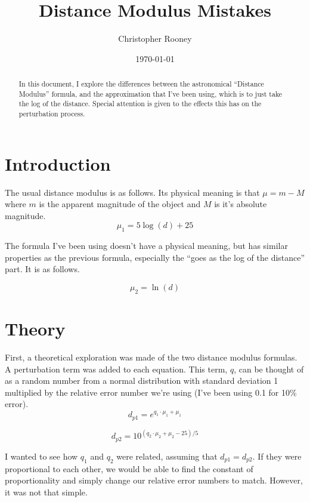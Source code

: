 \documentclass[usenatbib]{mn2e}
\begin{document}
\author{Christopher Rooney}
\date{\today}
\title{Distance Modulus Mistakes}
\maketitle

\begin{abstract}
In this document, I explore the differences between the astronomical ``Distance Modulus'' formula, and the approximation that I've been using, which is to just take the log of the distance. Special attention is given to the effects this has on the perturbation process.
\end{abstract}

\section{Introduction}
The usual distance modulus is as follows. Its physical meaning is that $\mu = m-M$ where $m$ is the apparent magnitude of the object and $M$ is it's absolute magnitude.
\begin{equation} \label{eq:modulus}
\mu_1 = 5\log\left(d\right) + 25
\end{equation}

The formula I've been using doesn't have a physical meaning, but has similar properties as the previous formula, especially the ``goes as the log of the distance'' part. It is as follows.

\begin{equation}\label{eq:log}
\mu_2 = \ln\left(d\right)
\end{equation}


\section{Theory}
First, a theoretical exploration was made of the two distance modulus formulas. A perturbation term was added to each equation. This term, $q$, can be thought of as a random number from a normal distribution with standard deviation 1 multiplied by the relative error number we're using (I've been using 0.1 for 10\% error).
\[
d_{p1} = e^{q_1\cdot\mu_1 + \mu_1}
\]

\[
d_{p2} = 10^{\left(q_2\cdot\mu_2 + \mu_2 - 25\right) / 5}
\]

I wanted to see how $q_1$ and $q_2$ were related, assuming that $d_{p1}=d_{p2}$. If they were proportional to each other, we would be able to find the constant of proportionality and simply change our relative error numbers to match. However, it was not that simple.
\end{document}
